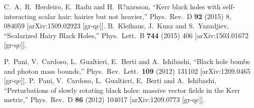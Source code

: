 \documentclass{article}
\numberwithin{equation}{section}
\begin{document}
\begin{small}
\begin{thebibliography}{99}
  C.~A.~R.~Herdeiro, E.~Radu and H.~R?narsson,
  ``Kerr black holes with self-interacting scalar hair: hairier but not heavier,''
  Phys.\ Rev.\ D {\bf 92} (2015) 8,  084059
  [arXiv:1509.02923 [gr-qc]].
  B.~Kleihaus, J.~Kunz and S.~Yazadjiev,
  ``Scalarized Hairy Black Holes,''
  Phys.\ Lett.\ B {\bf 744} (2015) 406
  [arXiv:1503.01672 [gr-qc]].

  P.~Pani, V.~Cardoso, L.~Gualtieri, E.~Berti and A.~Ishibashi,
  ``Black hole bombs and photon mass bounds,''
  Phys.\ Rev.\ Lett.\  {\bf 109} (2012) 131102
  [arXiv:1209.0465 [gr-qc]].
  P.~Pani, V.~Cardoso, L.~Gualtieri, E.~Berti and A.~Ishibashi,
  ``Perturbations of slowly rotating black holes: massive vector fields in the Kerr metric,''
  Phys.\ Rev.\ D {\bf 86} (2012) 104017
  [arXiv:1209.0773 [gr-qc]].


\end{thebibliography}
\end{small}
\end{document}
